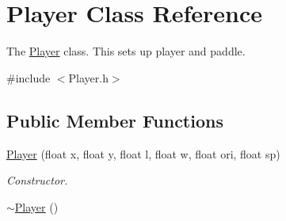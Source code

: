 \hypertarget{classPlayer}{\section{Player Class Reference}
\label{classPlayer}
}


The \hyperlink{classPlayer}{Player} class. This sets up player and paddle.  




{\ttfamily \#include $<$Player.\+h$>$}

\subsection*{Public Member Functions}
\begin{DoxyCompactItemize}
\item 
\hyperlink{classPlayer_a8b3405e45f13fe028bc6d8b5d4858c61}{Player} (float x, float y, float l, float w, float ori, float sp)
\begin{DoxyCompactList}\small\item\em Constructor. \end{DoxyCompactList}\item 
\hypertarget{classPlayer_a749d2c00e1fe0f5c2746f7505a58c062}{\hyperlink{classPlayer_a749d2c00e1fe0f5c2746f7505a58c062}{$\sim$\+Player} ()}\label{classPlayer_a749d2c00e1fe0f5c2746f7505a58c062}


\end{DoxyCompactItemize}
